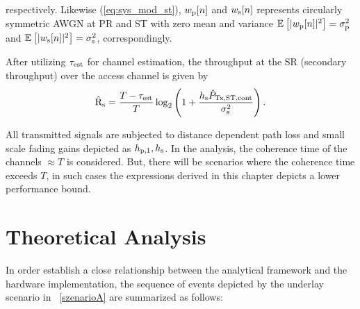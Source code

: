 respectively. Likewise (\ref{eq:sys_mod_st}), $w_{\text{p}}[n]$ and $w_{\text{s}}[n]$ represents circularly symmetric AWGN at PR and ST with zero mean and variance ${\mathbb E}_{}\left[ |w_{\text{p}}[n]|^2 \right] = \sigma^2_{\text{p}}$ and ${\mathbb E}_{}\left[ |w_{\text{s}}[n]|^2 \right] = \sigma^2_{\text{s}}$, correspondingly. %

After utilizing $\tau_{\text{est}}$ for channel estimation, the throughput at the SR (secondary throughput) over the access channel is given by
\begin{equation}
\hat{\text{{R}}}_{\text{s}} = \frac{T - \tau_{\text{est}}}{T} \log_2 \left(1 + \frac{h_{\text{s}} \hat{P}_{\text{Tx,ST,cont}} }{\sigma^2_{\text{s}}} \right). 
\label{eq:sthr}
\end{equation}


All transmitted signals are subjected to distance dependent path loss and small scale fading gains depicted as $h_{\text{p,1}}, h_{\text{s}}$. In the analysis, the coherence time of the channels $\approx T$ is considered. But, there will be scenarios where the coherence time exceeds $T$, in such cases the expressions derived in this chapter depicts a lower performance bound.


\section{Theoretical Analysis}
\label{model}
In order establish a close relationship between the analytical framework and the hardware implementation, the sequence of events depicted by the underlay scenario in \figurename~\ref{szenarioA} are summarized as follows:

